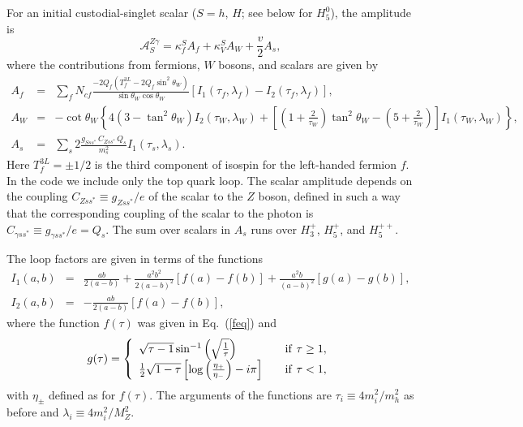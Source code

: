 \documentclass[11pt]{article}
\begin{document}
For an initial custodial-singlet scalar ($S = h$, $H$; see below for $H_5^0$), the amplitude is
\begin{equation}
	\mathcal{A}_S^{Z\gamma} = \kappa_f^S A_f + \kappa_V^S A_W + \frac{v}{2} A_s,
\end{equation}
where the contributions from fermions, $W$ bosons, and scalars are given by~\cite{HHG}
\begin{eqnarray}
	A_f &=& \sum_f N_{cf} 
	\frac{-2 Q_f \left(T^{3L}_f - 2 Q_f \sin^2\theta_W\right)}{\sin\theta_W\cos\theta_W}
	\left[ I_1(\tau_f,\lambda_f)-I_2(\tau_f,\lambda_f) \right], \nonumber \\
	A_W &=& -\cot\theta_W\left\{4\left(3-\tan^2\theta_W\right) I_2\left(\tau_W,\lambda_W\right)+\left[\left(1+\frac{2}{\tau_W}\right)\tan^2\theta_W-\left(5+\frac{2}{\tau_W}\right)\right] I_1\left(\tau_W,\lambda_W\right)\right\}, \nonumber \\
	A_s &=& \sum_s 2 \frac{g_{Sss^*}\,C_{Zss^*}\,Q_s}{m_s^2}
	I_1\left( \tau_s, \lambda_s \right).
	\label{eq:Zgaamps}
\end{eqnarray}
Here $T^{3L}_f = \pm 1/2$ is the third component of isospin for the left-handed fermion $f$.  In the code we include only the top quark loop.  The scalar amplitude depends on the coupling $C_{Zss^*} \equiv g_{Zss^*}/e$ of the scalar to the $Z$ boson, defined in  such a way that the corresponding coupling of the scalar to the photon is $C_{\gamma s s^*} \equiv g_{\gamma s s^*}/e = Q_s$.  The sum over scalars in $A_s$ runs over $H_3^+$, $H_5^+$, and $H_5^{++}$.

The loop factors are given in terms of the functions~\cite{HHG}
\begin{eqnarray}
	 I_1(a,b) &=& \frac{ab}{2(a-b)} + \frac{a^2b^2}{2(a-b)^2} \left[f(a) - f(b)\right]
	 + \frac{a^2b}{(a-b)^2} \left[g(a) - g(b)\right], \nonumber \\
	 I_2(a,b) &=& -\frac{ab}{2(a-b)} \left[f(a) - f(b)\right],
	 \label{eq:I1I2}
\end{eqnarray}
where the function $f(\tau)$ was given in Eq.~(\ref{feq}) and
\begin{equation}
	g(\tau) = \left\{ \begin{array}{l l}
	\sqrt{\tau-1} \sin^{-1} \left(\sqrt{\frac{1}{\tau}}\right) & \quad  {\rm if} \ \tau \geq 1, \\
	\frac{1}{2} \sqrt{1-\tau} \left[ \log \left(\frac{\eta_+}{\eta_-}\right) - i \pi \right] 
		& \quad  {\rm if} \ \tau < 1,
	\end{array} \right.
	\label{geq}
\end{equation}
with $\eta_{\pm}$ defined as for $f(\tau)$.  The arguments of the functions are $\tau_i \equiv 4 m_i^2/m_h^2$ as before and $\lambda_i \equiv 4 m_i^2/M_Z^2$.
\end{document}

